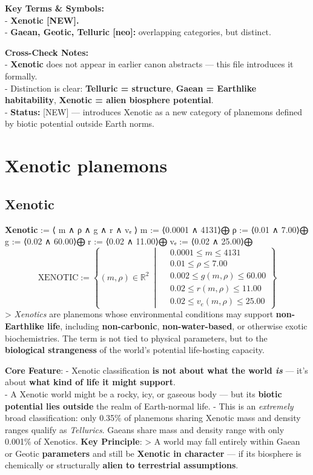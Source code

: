 \documentclass[
  letterpaper,
]{book}
\begin{document}
\textbf{Key Terms \& Symbols:}\\
- \textbf{Xenotic {[}NEW{]}.}\\
- \textbf{Gaean, Geotic, Telluric {[}neo{]}:} overlapping categories,
but distinct.

\textbf{Cross-Check Notes:}\\
- \textbf{Xenotic} does not appear in earlier canon abstracts --- this
file introduces it formally.\\
- Distinction is clear: \textbf{Telluric = structure}, \textbf{Gaean =
Earthlike habitability}, \textbf{Xenotic = alien biosphere potential}.\\
- \textbf{Status:} {[}NEW{]} --- introduces Xenotic as a new category of
planemons defined by biotic potential outside Earth norms.

\chapter{Xenotic planemons}\label{xenotic-planemons}

\section{Xenotic}\label{xenotic}

\textbf{Xenotic} := ⟨ m ∧ ρ ∧ g ∧ r ∧ vₑ ⟩ m := ⟨0.0001 ∧ 4131⟩⨁ ρ :=
⟨0.01 ∧ 7.00⟩⨁ g := ⟨0.02 ∧ 60.00⟩⨁ r := ⟨0.02 ∧ 11.00⟩⨁ vₑ := ⟨0.02 ∧
25.00⟩⨁
\[\text{XENOTIC} := \left\{ (m, \rho) \in \mathbb{R}^2 \ \middle|\
\begin{aligned}
&0.0001 \leq m \leq 4131 \\
&0.01 \leq \rho \leq 7.00 \\
&0.002 \leq g(m, \rho) \leq 60.00 \\
&0.02 \leq r(m, \rho) \leq 11.00 \\
&0.02 \leq v_e(m, \rho) \leq 25.00
\end{aligned}
\right\}
\] \textgreater{} \emph{Xenotics} are planemons whose environmental
conditions may support \textbf{non-Earthlike life}, including
\textbf{non-carbonic}, \textbf{non-water-based}, or otherwise exotic
biochemistries. The term is not tied to physical parameters, but to the
\textbf{biological strangeness} of the world's potential life-hosting
capacity.

\textbf{Core Feature}: - Xenotic classification \textbf{is not about
what the world \emph{is}} --- it's about \textbf{what kind of life it
might support}.\\
- A Xenotic world might be a rocky, icy, or gaseous body --- but its
\textbf{biotic potential lies outside} the realm of Earth-normal life. -
This is an \emph{extremely} broad classification: only 0.35\% of
planemons sharing Xenotic mass and density ranges qualify as
\emph{Tellurics}. Gaeans share mass and density range with only 0.001\%
of Xenotics. \textbf{Key Principle}: \textgreater{} A world may fall
entirely within Gaean or Geotic \textbf{parameters} and still be
\textbf{Xenotic in character} --- if its biosphere is chemically or
structurally \textbf{alien to terrestrial assumptions}.
\end{document}
